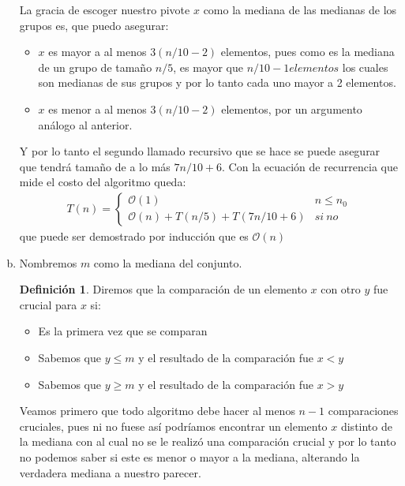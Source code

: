 \documentclass[dcc,uchile]{fcfmcourse}
\theoremstyle{plain}
\theoremstyle{definition}
\newtheorem{defi}{Definici\'on}
\begin{document}
\begin{problems}
\begin{enumerate}[a)]
\begin{algorithm}[H]
{{        }
    }
    \end{algorithm}
    La gracia de escoger nuestro pivote $x$ como la mediana de las medianas de los grupos es, que puedo asegurar:
    \begin{itemize}
        \item $x$ es mayor a al menos $3(n/10 - 2)$ elementos, pues como es la mediana de un grupo de tamaño $n/5$, es mayor que $n/10-1 elementos$ los cuales son medianas de sus grupos y por lo tanto cada uno mayor a 2 elementos.
        \item $x$ es menor a al menos $3(n/10 - 2)$ elementos, por un argumento análogo al anterior.
    \end{itemize}
    Y por lo tanto el segundo llamado recursivo que se hace se puede asegurar que tendrá tamaño de a lo más $7n/10+6$.
    Con la ecuación de recurrencia que mide el costo del algoritmo queda:
    \begin{align*}
    T(n) = \begin{cases} 
      \mathcal{O}(1) & n \leq n_0 \\
       \mathcal{O}(n) + T(n/5) + T(7n/10+6) & si\ no  
   \end{cases}
    \end{align*}
    que puede ser demostrado por inducción que es $\mathcal{O}(n)$
    \item Nombremos $m$ como la mediana del conjunto.
    \begin{defi}
    Diremos que la comparación de un elemento $x$ con otro $y$ fue crucial para $x$ si:
    \begin{itemize}
    \item Es la primera vez que se comparan
    \item Sabemos que $y\le m$ y el resultado de la comparación fue $x<y$
    \item Sabemos que $y\ge m$ y el resultado de la comparación fue $x>y$
    \end{itemize}
    \end{defi}
    Veamos primero que todo algoritmo debe hacer al menos $n-1$ comparaciones cruciales, pues ni no fuese así podríamos encontrar un elemento $x$ distinto de la mediana con al cual no se le realizó una comparación crucial y por lo tanto no podemos saber si este es menor o mayor a la mediana, alterando la verdadera mediana a nuestro parecer.\\
    

\end{enumerate}
\end{problems}
\end{document}
